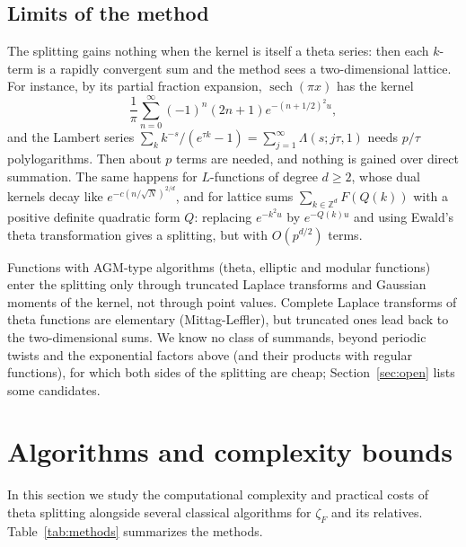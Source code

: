 \documentclass[11pt,reqno]{amsart}
\theoremstyle{definition}
\theoremstyle{remark}
\newcommand{\ZZ}{\mathbb{Z}}
\begin{document}
\subsection{Limits of the method}\label{sec:limits}
The splitting gains nothing when the kernel is itself a theta series: then each $k$-term is a rapidly convergent sum
and the method sees a two-dimensional lattice. For instance, by its partial fraction expansion,
$\operatorname{sech}(\pi x)$ has the kernel
\[
  \frac1\pi\sum_{n=0}^{\infty}(-1)^n(2n+1)e^{-(n+1/2)^2u},
\]
and the Lambert series $\sum_kk^{-s}/(e^{\tau k}-1) = \sum_{j=1}^{\infty}\Lambda(s;j\tau,1)$ needs $p/\tau$
polylogarithms. Then about $p$ terms are needed, and nothing is gained over direct summation.
The same happens for $L$-functions of degree $d \ge 2$, whose dual kernels decay like $e^{-c(n/\sqrt N)^{2/d}}$, and
for lattice sums $\sum_{k\in\ZZ^d}F(Q(k))$ with a positive definite quadratic form $Q$: replacing $e^{-k^2u}$ by
$e^{-Q(k)u}$ and using Ewald's theta transformation gives a splitting, but with $O(p^{d/2})$ terms.

Functions with AGM-type algorithms (theta, elliptic and modular functions) enter the splitting only through truncated
Laplace transforms and Gaussian moments of the kernel, not through point values. Complete Laplace transforms of theta
functions are elementary (Mittag-Leffler), but truncated ones lead back to the two-dimensional sums. We know no class
of summands, beyond periodic twists and the exponential factors above (and their products with regular functions),
for which both sides of the splitting are cheap; Section~\ref{sec:open} lists some candidates.

\section{Algorithms and complexity bounds}\label{sec:complexity}

In this section we study the computational complexity and practical costs
of theta splitting alongside several classical algorithms
for $\zeta_F$ and its relatives.
Table~\ref{tab:methods} summarizes the methods.
\end{document}

